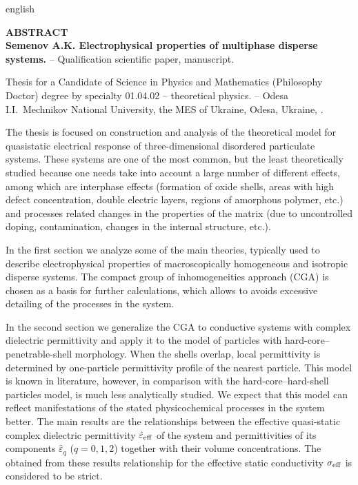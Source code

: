 \begin{otherlanguage*}{english}
\begin{center}
    {\normalfont \textbf{
    	ABSTRACT\\
    	Semenov A.K. Electrophysical properties of multiphase disperse systems.} -- Qualification scientific paper, manuscript.}
\end{center}
\vskip 5pt

Thesis for a Candidate of Science in Physics and Mathematics (Philosophy Doctor) degree by specialty 01.04.02 -- theoretical physics. -- Odesa I.I.~Mechnikov National University, the MES of Ukraine, Odesa, Ukraine, \the\year.

\vskip 5pt

The thesis is focused on construction and analysis of the theoretical model for quasistatic electrical response of three-dimensional disordered particulate systems. These systems are one of the most common, but the least theoretically studied because one needs take into account a large number of different effects, among which are interphase effects (formation of oxide shells, areas with high defect concentration, double electric layers, regions of amorphous polymer, etc.) and processes related changes in the properties of the matrix (due to uncontrolled doping, contamination, changes in the internal structure, etc.).

In the first section we analyze some of the main theories, typically used to describe electrophysical properties of macroscopically homogeneous and isotropic disperse systems. The compact group of inhomogeneities approach (CGA) is chosen as a basis for further calculations, which allows to avoids excessive detailing of the processes in the system.

In the second section we generalize the CGA to conductive systems with complex dielectric permittivity and apply it to the model of particles with hard-core--penetrable-shell morphology. When the shells overlap, local permittivity is determined by one-particle permittivity profile of the nearest particle.
This model is known in literature, however, in comparison with the   hard-core--hard-shell particles model, is much less analytically studied. We expect that this model can reflect manifestations of the stated physicochemical processes in the system better.
The main results are the relationships between the effective quasi-static complex dielectric permittivity $ \hat {\varepsilon} _ {\rm eff} $ of the system and permittivities of its components $ \hat {\varepsilon} _ {q} $ ($ q = 0,1,2 $) together with their volume concentrations. The obtained from these results relationship for the effective static conductivity $ \sigma _ {\rm eff} $ is considered to be strict.


\end{otherlanguage*}
